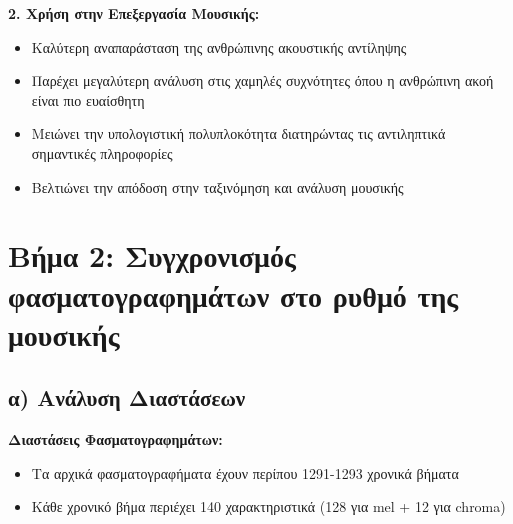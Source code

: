 \documentclass[a4paper,12pt]{article}
\begin{document}
\textbf{2. Χρήση στην Επεξεργασία Μουσικής:}
\begin{itemize}
    \item Καλύτερη αναπαράσταση της ανθρώπινης ακουστικής αντίληψης
    \item Παρέχει μεγαλύτερη ανάλυση στις χαμηλές συχνότητες όπου η ανθρώπινη ακοή είναι πιο ευαίσθητη
    \item Μειώνει την υπολογιστική πολυπλοκότητα διατηρώντας τις αντιληπτικά σημαντικές πληροφορίες
    \item Βελτιώνει την απόδοση στην ταξινόμηση και ανάλυση μουσικής
\end{itemize}

\section*{Βήμα 2: Συγχρονισμός φασματογραφημάτων στο ρυθμό της μουσικής}

\subsection*{α) Ανάλυση Διαστάσεων}

\textbf{Διαστάσεις Φασματογραφημάτων:}
\begin{itemize}
    \item Τα αρχικά φασματογραφήματα έχουν περίπου 1291-1293 χρονικά βήματα
    \item Κάθε χρονικό βήμα περιέχει 140 χαρακτηριστικά (128 για mel + 12 για chroma)
\end{itemize}
\end{document}
